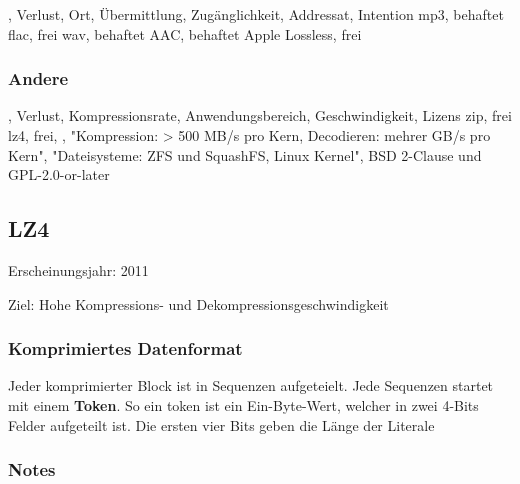 \startplacetable[location={here},title={}]
\setupTABLE[c][1][background=color,backgroundcolor=gray]
\setupTABLE[r][1][background=color,backgroundcolor=gray]
\bTABLE[option=stratch,offset=1mm]
\startCSV
[background=DiagonalRule] , Verlust, Ort, Übermittlung, Zugänglichkeit, Addressat, Intention
mp3, behaftet
flac, frei
wav, behaftet
AAC, behaftet
Apple Lossless, frei
\stopCSV
\eTABLE
\stopplacetable

\subsubsection{Andere}

\startframedtext[width=\dimexpr\textwidth+\rightmarginwidth+\rightmargindistance\relax,frame=off,offset=none] %
\startplacetable[location={here},title={}]
\setupTABLE[c][1][background=color,backgroundcolor=gray]
\setupTABLE[r][1][background=color,backgroundcolor=gray]
\bTABLE[option=stratch,offset=1mm]
\startCSV
[background=DiagonalRule] , Verlust, Kompressionsrate, Anwendungsbereich, Geschwindigkeit, Lizens
zip, frei 
lz4, frei, , "Kompression: > 500 MB/s pro Kern, Decodieren: mehrer GB/s pro Kern", "Dateisysteme: ZFS und SquashFS, Linux Kernel", BSD 2-Clause und GPL-2.0-or-later
\stopCSV
\eTABLE
\stopplacetable
\stopframedtext


\subsection{LZ4}

\startitemize[packed]
\item Erscheinungsjahr: 2011
\item Ziel: Hohe Kompressions- und Dekompressionsgeschwindigkeit
\stopitemize

\subsubsection{Komprimiertes Datenformat}

Jeder komprimierter Block ist in Sequenzen aufgeteielt. Jede Sequenzen startet
mit einem {\bf Token}. So ein token ist ein Ein-Byte-Wert, welcher in zwei
4-Bits Felder aufgeteilt ist. Die ersten vier Bits geben die Länge der Literale

\subsubsection{Notes}





